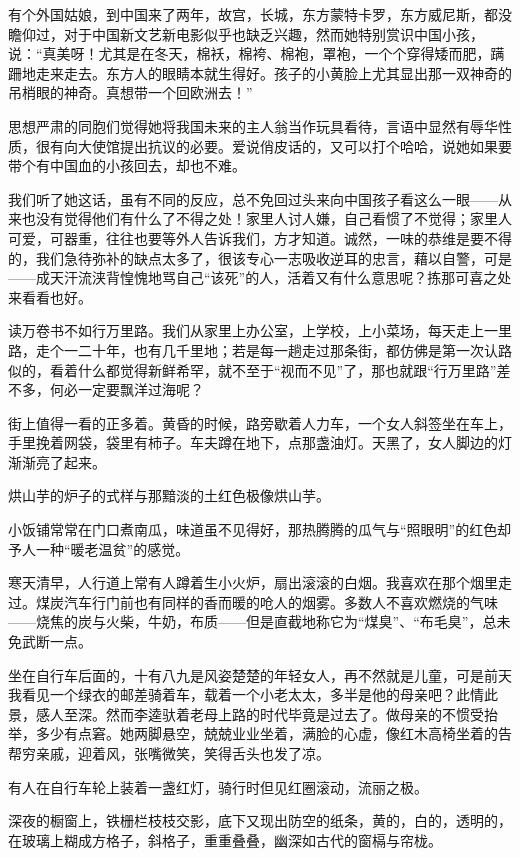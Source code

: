 \par 有个外国姑娘，到中国来了两年，故宫，长城，东方蒙特卡罗，东方威尼斯，都没瞻仰过，对于中国新文艺新电影似乎也缺乏兴趣，然而她特别赏识中国小孩，说：“真美呀！尤其是在冬天，棉袄，棉袴、棉袍，罩袍，一个个穿得矮而肥，蹒跚地走来走去。东方人的眼睛本就生得好。孩子的小黄脸上尤其显出那一双神奇的吊梢眼的神奇。真想带一个回欧洲去！”
\par 思想严肃的同胞们觉得她将我国未来的主人翁当作玩具看待，言语中显然有辱华性质，很有向大使馆提出抗议的必要。爱说俏皮话的，又可以打个哈哈，说她如果要带个有中国血的小孩回去，却也不难。
\par 我们听了她这话，虽有不同的反应，总不免回过头来向中国孩子看这么一眼——从来也没有觉得他们有什么了不得之处！家里人讨人嫌，自己看惯了不觉得；家里人可爱，可器重，往往也要等外人告诉我们，方才知道。诚然，一味的恭维是要不得的，我们急待弥补的缺点太多了，很该专心一志吸收逆耳的忠言，藉以自警，可是——成天汗流浃背惶愧地骂自己“该死”的人，活着又有什么意思呢？拣那可喜之处来看看也好。
\par 读万卷书不如行万里路。我们从家里上办公室，上学校，上小菜场，每天走上一里路，走个一二十年，也有几千里地；若是每一趟走过那条街，都仿佛是第一次认路似的，看着什么都觉得新鲜希罕，就不至于“视而不见”了，那也就跟“行万里路”差不多，何必一定要飘洋过海呢？
\par 街上值得一看的正多着。黄昏的时候，路旁歇着人力车，一个女人斜签坐在车上，手里挽着网袋，袋里有柿子。车夫蹲在地下，点那盏油灯。天黑了，女人脚边的灯渐渐亮了起来。
\par 烘山芋的炉子的式样与那黯淡的土红色极像烘山芋。
\par 小饭铺常常在门口煮南瓜，味道虽不见得好，那热腾腾的瓜气与“照眼明”的红色却予人一种“暖老温贫”的感觉。
\par 寒天清早，人行道上常有人蹲着生小火炉，扇出滚滚的白烟。我喜欢在那个烟里走过。煤炭汽车行门前也有同样的香而暖的呛人的烟雾。多数人不喜欢燃烧的气味——烧焦的炭与火柴，牛奶，布质——但是直截地称它为“煤臭”、“布毛臭”，总未免武断一点。
\par 坐在自行车后面的，十有八九是风姿楚楚的年轻女人，再不然就是儿童，可是前天我看见一个绿衣的邮差骑着车，载着一个小老太太，多半是他的母亲吧？此情此景，感人至深。然而李逵驮着老母上路的时代毕竟是过去了。做母亲的不惯受抬举，多少有点窘。她两脚悬空，兢兢业业坐着，满脸的心虚，像红木高椅坐着的告帮穷亲戚，迎着风，张嘴微笑，笑得舌头也发了凉。
\par 有人在自行车轮上装着一盏红灯，骑行时但见红圈滚动，流丽之极。
\par 深夜的橱窗上，铁栅栏枝枝交影，底下又现出防空的纸条，黄的，白的，透明的，在玻璃上糊成方格子，斜格子，重重叠叠，幽深如古代的窗槅与帘栊。
